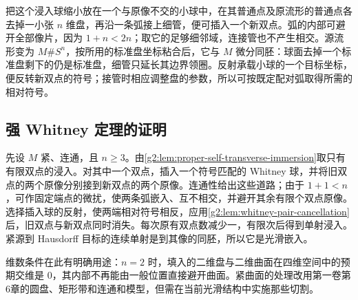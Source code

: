 把这个浸入球缩小放在一个与原像不交的小球中，在其普通点及原流形的普通点各去掉一小张 \(n\) 维盘，再沿一条弧接上细管，便可插入一个新双点。弧的内部可避开全部像片，因为 \(1+n<2n\)；取它的足够细邻域，连接管也不产生相交。源流形变为 \(M\#S^n\)，按所用的标准盘坐标粘合后，它与 \(M\) 微分同胚：球面去掉一个标准盘剩下的仍是标准盘，细管只延长其边界领圈。反射承载小球的一个目标坐标，便反转新双点的符号；接管时相应调整盘的参数，所以可按既定配对弧取得所需的相对符号。

\subsection{强 Whitney 定理的证明}
\label{g2:subsec:1502:03}

先设 \(M\) 紧、连通，且 \(n\ge3\)。由\cref{g2:lem:proper-self-transverse-immersion}取只有有限双点的浸入。对其中一个双点，插入一个符号匹配的 Whitney 球，并将旧双点的两个原像分别接到新双点的两个原像。连通性给出这些道路；由于 \(1+1<n\)，可作固定端点的微扰，使两条弧嵌入、互不相交，并避开其余有限个双点原像。选择插入球的反射，使两端相对符号相反，应用\cref{g2:lem:whitney-pair-cancellation}后，旧双点与新双点同时消失。每次原有双点数减少一，有限次后得到单射浸入。紧源到 Hausdorff 目标的连续单射是到其像的同胚，所以它是光滑嵌入。

\ProseParagraphBreak

维数条件在此有明确用途：\(n=2\) 时，填入的二维盘与二维曲面在四维空间中的预期交维是 \(0\)，其内部不再能由一般位置直接避开曲面。紧曲面的处理改用第一卷第6章的圆盘、矩形带和连通和模型，但需在当前光滑结构中实施那些切割。

